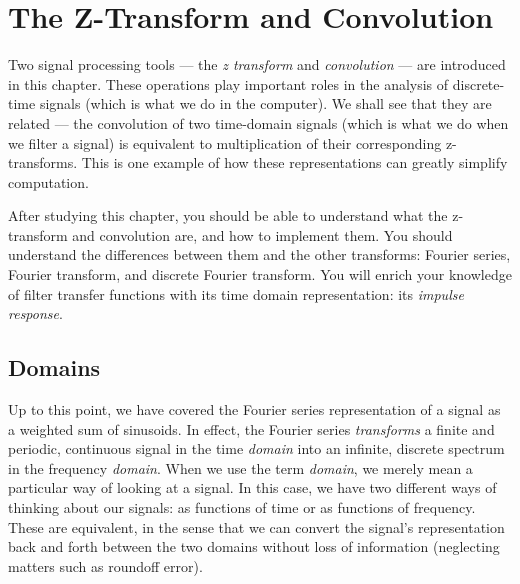 
%
%
%
%
%
%

\chapter{The Z-Transform and Convolution}
\label{ch:convolution}

Two signal processing tools --- the \emph{z transform} and
\emph{convolution} --- are introduced in this chapter.  These
operations play important roles in the analysis of discrete-time
signals (which is what we do in the computer). We shall see that they
are related --- the convolution of two time-domain signals (which is
what we do when we filter a signal) is equivalent to multiplication of
their corresponding z-transforms. This is one example of how these
representations can greatly simplify computation.

After studying this chapter, you should be able to understand what the
z-transform and convolution are, and how to implement them. You should
understand the differences between them and the other transforms:
Fourier series, Fourier transform, and discrete Fourier transform. You
will enrich your knowledge of filter transfer functions with its time
domain representation: its \emph{impulse response}.

\section{Domains}

Up to this point, we have covered the Fourier series representation of
a signal as a weighted sum of sinusoids. In effect, the Fourier series
\emph{transforms} a finite and periodic, continuous signal in the time
\emph{domain} into an infinite, discrete spectrum in the frequency
\emph{domain}.
When we use the term \emph{domain}, we merely mean a particular way of
looking at a signal. In this case, we have two different ways of
thinking about our signals: as functions of time or as functions of
frequency. These are equivalent, in the sense that we can convert the
signal's representation back and forth between the two domains without
loss of information (neglecting matters such as roundoff error).

